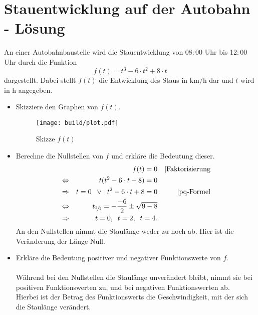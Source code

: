 



\section*{Stauentwicklung auf der Autobahn - Lösung}

An einer Autobahnbaustelle wird die Stauentwicklung von 08$:$00 Uhr bis 12$:$00 Uhr durch die Funktion
\begin{equation*}
    f(t) = t^3-6\cdot t^2+8\cdot t
\end{equation*}
dargestellt.
Dabei stellt $f(t)$ die Entwicklung des Staus in $\si{\kilo\meter\per\hour}$ dar und $t$ wird in $\si{\hour}$ angegeben.

\begin{itemize}
    \item Skizziere den Graphen von $f(t)$.
        \begin{figure}[H]
            \centering
            \texttt{[image: build/plot.pdf]}
            \caption{Skizze $f(t)$}
            \label{fig:f(t)}
        \end{figure}
    \item Berechne die Nullstellen von $f$ und erkläre die Bedeutung dieser.
      \begin{align*}
        &&f(t)=0 && | \text{Faktorisierung}\\
        \Leftrightarrow && t(t^2-6\cdot t + 8) = 0 \\
        \Rightarrow && t=0 \;\; \lor \;\; t^2-6\cdot t + 8 = 0 && | \text{pq-Formel}\\
        \Leftrightarrow && t_{\sfrac{1}{2}}=-\frac{-6}{2} \pm \sqrt{9-8} &&\\
        \Rightarrow && t=0, \;\; t=2, \;\; t=4.&&
      \end{align*}
      An den Nullstellen nimmt die Staulänge weder zu noch ab. Hier ist die Veränderung der Länge Null.\\
    \item Erkläre die Bedeutung positiver und negativer Funktionswerte von $f$.\\\\
      Während bei den Nullstellen die Staulänge unverändert bleibt, nimmt sie bei positiven Funktionswerten zu, und bei negativen Funktionswerten ab.\\
      Hierbei ist der Betrag des Funktionswerts die Geschwindigkeit, mit der sich die Staulänge verändert.\\

\end{itemize}
